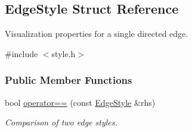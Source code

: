 \hypertarget{structEdgeStyle}{}\subsection{Edge\+Style Struct Reference}
\label{structEdgeStyle}


Visualization properties for a single directed edge.  




{\ttfamily \#include $<$style.\+h$>$}

\subsubsection*{Public Member Functions}
\begin{DoxyCompactItemize}
\item 
bool \hyperlink{structEdgeStyle_a7e5afbf40cc2fef9de6723fceb3d9b46}{operator==} (const \hyperlink{structEdgeStyle}{Edge\+Style} \&rhs)\hypertarget{structEdgeStyle_a7e5afbf40cc2fef9de6723fceb3d9b46}{}\label{structEdgeStyle_a7e5afbf40cc2fef9de6723fceb3d9b46}

\begin{DoxyCompactList}\small\item\em Comparison of two edge styles. \end{DoxyCompactList}\end{DoxyCompactItemize}
